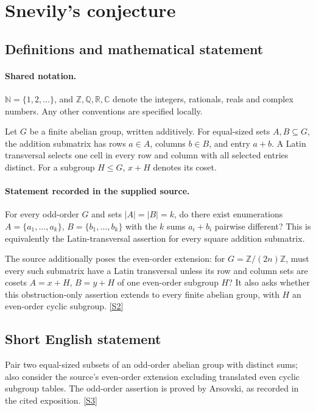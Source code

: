\documentclass[11pt]{article}
\newcommand{\sref}[2]{\hyperlink{source:#1:#2}{[S#2]}}
\begin{document}
\section{Snevily's conjecture}\label{statement}

\subsection{Definitions and mathematical statement}

\paragraph{Shared notation.}$\mathbb N=\{1,2,\ldots\}$, and $\mathbb Z,\mathbb Q,\mathbb R,\mathbb C$ denote the integers, rationals, reals and complex numbers. Any other conventions are specified locally.


Let $G$ be a finite abelian group, written additively. For equal-sized sets $A,B\subseteq G$, the addition submatrix has rows $a\in A$, columns $b\in B$, and entry $a+b$. A Latin transversal selects one cell in every row and column with all selected entries distinct. For a subgroup $H\le G$, $x+H$ denotes its coset.
\paragraph{Statement recorded in the supplied source.}
For every odd-order $G$ and sets $|A|=|B|=k$, do there exist enumerations $A=\{a_1,\ldots,a_k\}$, $B=\{b_1,\ldots,b_k\}$ with the $k$ sums $a_i+b_i$ pairwise different? This is equivalently the Latin-transversal assertion for every square addition submatrix.

The source additionally poses the even-order extension: for $G=\mathbb Z/(2n)\mathbb Z$, must every such submatrix have a Latin transversal unless its row and column sets are cosets $A=x+H$, $B=y+H$ of one even-order subgroup $H$? It also asks whether this obstruction-only assertion extends to every finite abelian group, with $H$ an even-order cyclic subgroup. \sref{statement}{2}
\subsection{Short English statement}
Pair two equal-sized subsets of an odd-order abelian group with distinct sums; also consider the source’s even-order extension excluding translated even cyclic subgroup tables. The odd-order assertion is proved by Arsovski, as recorded in the cited exposition. \sref{statement}{3}
\end{document}
